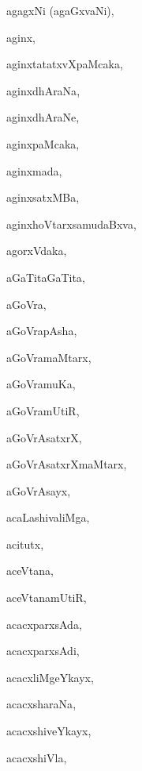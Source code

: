 \begin{multicols}{3}
{\noindent
{agagxNi (agaGxvaNi)}, \pageref{agagxNi (agaGxvaNi)}

\noindent
{aginx}, \pageref{aginx}

\noindent
{aginxtatatxvXpaMcaka}, \pageref{aginxtatatxvXpaMcaka}

\noindent
{aginxdhAraNa}, \pageref{aginxdhAraNa}

\noindent
{aginxdhAraNe}, \pageref{aginxdhAraNe}

\noindent
{aginxpaMcaka}, \pageref{aginxpaMcaka}

\noindent
{aginxmada}, \pageref{aginxmada}

\noindent
{aginxsatxMBa}, \pageref{aginxsatxMBa}

\noindent
{aginxhoVtarxsamudaBxva}, \pageref{aginxhoVtarxsamudaBxva}

\noindent
{agorxVdaka}, \pageref{agorxVdaka}

\noindent
{aGaTitaGaTita}, \pageref{aGaTitaGaTita}

\noindent
{aGoVra}, \pageref{aGoVra}

\noindent
{aGoVrapAsha}, \pageref{aGoVrapAsha}

\noindent
{aGoVramaMtarx}, \pageref{aGoVramaMtarx}

\noindent
{aGoVramuKa}, \pageref{aGoVramuKa}

\noindent
{aGoVramUtiR}, \pageref{aGoVramUtiR}

\noindent
{aGoVrAsatxrX}, \pageref{aGoVrAsatxrX}

\noindent
{aGoVrAsatxrXmaMtarx}, \pageref{aGoVrAsatxrXmaMtarx}

\noindent
{aGoVrAsayx}, \pageref{aGoVrAsayx}

\noindent
{acaLashivaliMga}, \pageref{acaLashivaliMga}

\noindent
{acitutx}, \pageref{acitutx}

\noindent
{aceVtana}, \pageref{aceVtana}

\noindent
{aceVtanamUtiR}, \pageref{aceVtanamUtiR}

\noindent
{acacxparxsAda}, \pageref{acacxparxsAda}

\noindent
{acacxparxsAdi}, \pageref{acacxparxsAdi}

\noindent
{acacxliMgeYkayx}, \pageref{acacxliMgeYkayx}

\noindent
{acacxsharaNa}, \pageref{acacxsharaNa}

\noindent
{acacxshiveYkayx}, \pageref{acacxshiveYkayx}

\noindent
{acacxshiVla}, \pageref{acacxshiVla}

}
\end{multicols}
